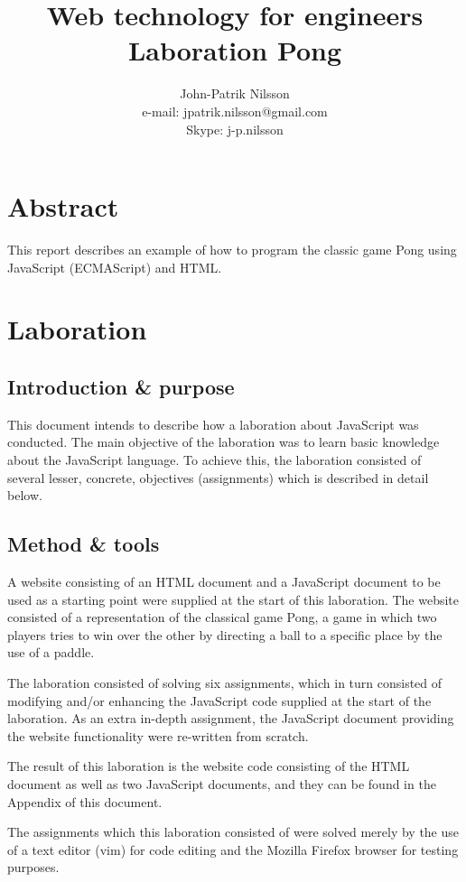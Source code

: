 \documentclass[a4paper,10pt]{article}
\title{Web technology for engineers \\
    Laboration Pong}
\author{John-Patrik Nilsson \\
    e-mail: jpatrik.nilsson@gmail.com \\
    Skype: j-p.nilsson}
\begin{document}
\maketitle

\pagestyle{empty}
\thispagestyle{empty}

\section{Abstract}
This report describes an example of how to program the classic game Pong using JavaScript (ECMAScript) and HTML.

\section{Laboration}
\subsection{Introduction \& purpose}
This document intends to describe how a laboration about JavaScript was conducted. The main objective of the laboration was to learn basic knowledge about the JavaScript language. To achieve this, the laboration consisted of several lesser, concrete, objectives (assignments) which is described in detail below.

\subsection{Method \& tools}
A website consisting of an HTML document and a JavaScript document to be used as a starting point were supplied at the start of this laboration. The website consisted of a representation of the classical game Pong, a game in which two players tries to win over the other by directing a ball to a specific place by the use of a paddle.

The laboration consisted of solving six assignments, which in turn consisted of modifying and/or enhancing the JavaScript code supplied at the start of the laboration. As an extra in-depth assignment, the JavaScript document providing the website functionality were re-written from scratch.

The result of this laboration is the website code consisting of the HTML document as well as two JavaScript documents, and they can be found in the Appendix of this document.

The assignments which this laboration consisted of were solved merely by the use of a text editor (vim) for code editing and the Mozilla Firefox browser for testing purposes.
\end{document}

